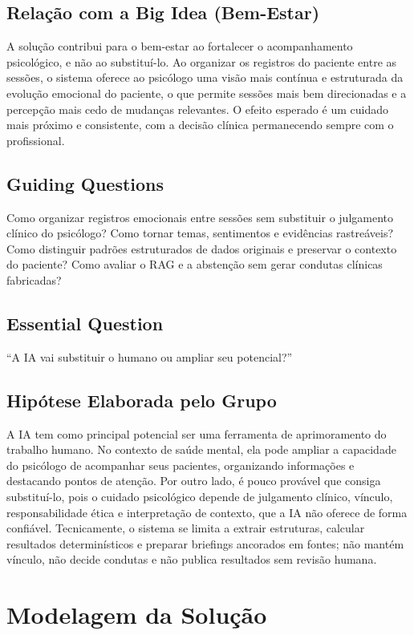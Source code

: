 \documentclass[12pt,a4paper]{article}
\begin{document}
\subsection{Relação com a Big Idea (Bem-Estar)}
A solução contribui para o bem-estar ao fortalecer o acompanhamento psicológico, e não ao substituí-lo. Ao organizar os registros do paciente entre as sessões, o sistema oferece ao psicólogo uma visão mais contínua e estruturada da evolução emocional do paciente, o que permite sessões mais bem direcionadas e a percepção mais cedo de mudanças relevantes. O efeito esperado é um cuidado mais próximo e consistente, com a decisão clínica permanecendo sempre com o profissional.

\subsection{Guiding Questions}
Como organizar registros emocionais entre sessões sem substituir o julgamento clínico do psicólogo?
Como tornar temas, sentimentos e evidências rastreáveis?
Como distinguir padrões estruturados de dados originais e preservar o contexto do paciente?
Como avaliar o RAG e a abstenção sem gerar condutas clínicas fabricadas?

\subsection{Essential Question}
``A IA vai substituir o humano ou ampliar seu potencial?''

\subsection{Hipótese Elaborada pelo Grupo}
A IA tem como principal potencial ser uma ferramenta de aprimoramento do trabalho humano. No contexto de saúde mental, ela pode ampliar a capacidade do psicólogo de acompanhar seus pacientes, organizando informações e destacando pontos de atenção. Por outro lado, é pouco provável que consiga substituí-lo, pois o cuidado psicológico depende de julgamento clínico, vínculo, responsabilidade ética e interpretação de contexto, que a IA não oferece de forma confiável. Tecnicamente, o sistema se limita a extrair estruturas, calcular resultados determinísticos e preparar briefings ancorados em fontes; não mantém vínculo, não decide condutas e não publica resultados sem revisão humana.


\section{Modelagem da Solução}
\end{document}
